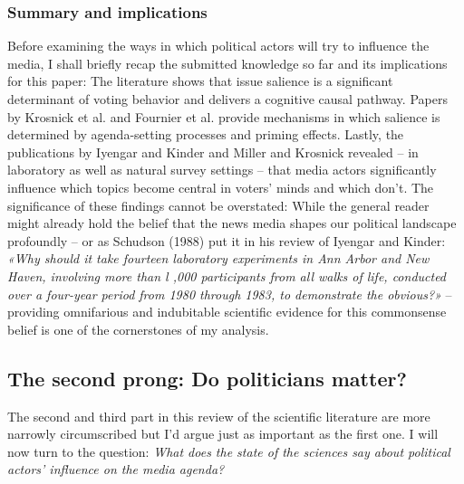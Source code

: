 \documentclass[11pt,a4paper]{article}
\begin{document}
\subsubsection{Summary and implications}
Before examining the ways in which political actors will try to influence the media, I shall briefly recap the submitted knowledge so far and its implications for this paper: The literature shows that issue salience is a significant determinant of voting behavior and delivers a cognitive causal pathway. Papers by Krosnick et al. and Fournier et al. provide mechanisms in which salience is determined by agenda-setting processes and priming effects. Lastly, the publications by Iyengar and Kinder and Miller and Krosnick revealed – in laboratory as well as natural survey settings – that media actors significantly influence which topics become central in voters’ minds and which don’t. The significance of these findings cannot be overstated: While the general reader might already hold the belief that the news media shapes our political landscape profoundly – or as Schudson (1988) put it in his review of Iyengar and Kinder: \textit{«Why should it take fourteen laboratory experiments in Ann Arbor and New Haven, involving more than l ,000 participants from all walks of life, conducted over a four-year period from 1980 through 1983, to demonstrate the obvious?»} – providing omnifarious and indubitable scientific evidence for this commonsense belief is one of the cornerstones of my analysis. 


\subsection{The second prong: Do politicians matter?}
The second and third part in this review of the scientific literature are more narrowly circumscribed but I’d argue just as important as the first one. I will now turn to the question: \textit{What does the state of the sciences say about political actors’ influence on the media agenda?} 
\end{document}
